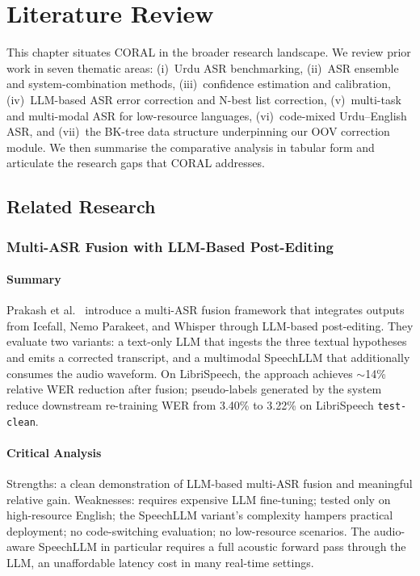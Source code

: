 \chapter{Literature Review}
\label{chap:litreview}

This chapter situates CORAL in the broader research landscape. We review prior work in seven thematic areas: (i)~Urdu ASR benchmarking, (ii)~ASR ensemble and system-combination methods, (iii)~confidence estimation and calibration, (iv)~LLM-based ASR error correction and N-best list correction, (v)~multi-task and multi-modal ASR for low-resource languages, (vi)~code-mixed Urdu--English ASR, and (vii)~the BK-tree data structure underpinning our OOV correction module. We then summarise the comparative analysis in tabular form and articulate the research gaps that CORAL addresses.

\section{Related Research}
\label{sec:related-research}

\subsection{Multi-ASR Fusion with LLM-Based Post-Editing}
\label{ssec:lit-prakash}

\subsubsection{Summary}
Prakash et al.~\cite{prakash2025multi} introduce a multi-ASR fusion framework that integrates outputs from Icefall, Nemo Parakeet, and Whisper through LLM-based post-editing. They evaluate two variants: a text-only LLM that ingests the three textual hypotheses and emits a corrected transcript, and a multimodal SpeechLLM that additionally consumes the audio waveform. On LibriSpeech, the approach achieves $\sim$14\% relative WER reduction after fusion; pseudo-labels generated by the system reduce downstream re-training WER from 3.40\% to 3.22\% on LibriSpeech \texttt{test-clean}.

\subsubsection{Critical Analysis}
Strengths: a clean demonstration of LLM-based multi-ASR fusion and meaningful relative gain. Weaknesses: requires expensive LLM fine-tuning; tested only on high-resource English; the SpeechLLM variant's complexity hampers practical deployment; no code-switching evaluation; no low-resource scenarios. The audio-aware SpeechLLM in particular requires a full acoustic forward pass through the LLM, an unaffordable latency cost in many real-time settings.

